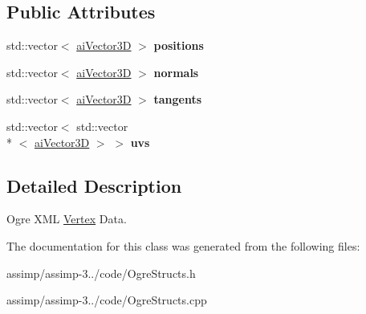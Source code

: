 \subsection*{Public Attributes}
\begin{DoxyCompactItemize}
\item 
\hypertarget{class_assimp_1_1_ogre_1_1_vertex_data_xml_aed2ad834a91d1035dd6213fe425eb6b4}{std\+::vector$<$ \hyperlink{structai_vector3_d}{ai\+Vector3\+D} $>$ {\bfseries positions}}\label{class_assimp_1_1_ogre_1_1_vertex_data_xml_aed2ad834a91d1035dd6213fe425eb6b4}

\item 
\hypertarget{class_assimp_1_1_ogre_1_1_vertex_data_xml_a9fee8774294f25fd714005bdd5e1b07f}{std\+::vector$<$ \hyperlink{structai_vector3_d}{ai\+Vector3\+D} $>$ {\bfseries normals}}\label{class_assimp_1_1_ogre_1_1_vertex_data_xml_a9fee8774294f25fd714005bdd5e1b07f}

\item 
\hypertarget{class_assimp_1_1_ogre_1_1_vertex_data_xml_ab902cfa32d7cde0a8d2e1ff89b806996}{std\+::vector$<$ \hyperlink{structai_vector3_d}{ai\+Vector3\+D} $>$ {\bfseries tangents}}\label{class_assimp_1_1_ogre_1_1_vertex_data_xml_ab902cfa32d7cde0a8d2e1ff89b806996}

\item 
\hypertarget{class_assimp_1_1_ogre_1_1_vertex_data_xml_a0f8dfa0221aaf0773a8542436eb7b40e}{std\+::vector$<$ std\+::vector\\*
$<$ \hyperlink{structai_vector3_d}{ai\+Vector3\+D} $>$ $>$ {\bfseries uvs}}\label{class_assimp_1_1_ogre_1_1_vertex_data_xml_a0f8dfa0221aaf0773a8542436eb7b40e}

\end{DoxyCompactItemize}


\subsection{Detailed Description}
Ogre X\+M\+L \hyperlink{class_assimp_1_1_vertex}{Vertex} Data. 

The documentation for this class was generated from the following files\+:\begin{DoxyCompactItemize}
\item 
assimp/assimp-\/3../code/Ogre\+Structs.\+h\item 
assimp/assimp-\/3../code/Ogre\+Structs.\+cpp\end{DoxyCompactItemize}
